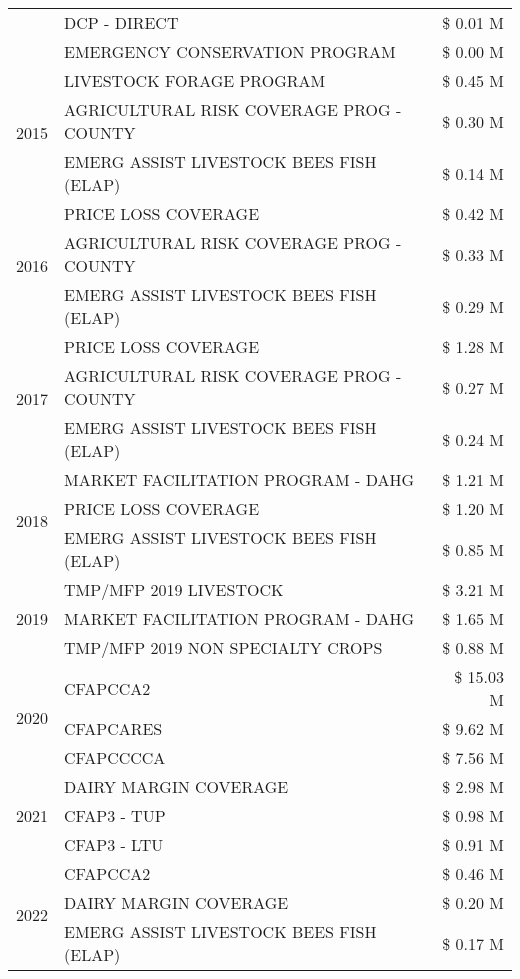 \begin{tabular}{llr}
 & DCP - DIRECT & \$ 0.01 M \\
 & EMERGENCY CONSERVATION PROGRAM & \$ 0.00 M \\
\cline{1-3}
\multirow[t]{3}{*}{2015} & LIVESTOCK FORAGE PROGRAM & \$ 0.45 M \\
 & AGRICULTURAL RISK COVERAGE PROG - COUNTY & \$ 0.30 M \\
 & EMERG ASSIST LIVESTOCK BEES FISH (ELAP) & \$ 0.14 M \\
\cline{1-3}
\multirow[t]{3}{*}{2016} & PRICE LOSS COVERAGE & \$ 0.42 M \\
 & AGRICULTURAL RISK COVERAGE PROG - COUNTY & \$ 0.33 M \\
 & EMERG ASSIST LIVESTOCK BEES FISH (ELAP) & \$ 0.29 M \\
\cline{1-3}
\multirow[t]{3}{*}{2017} & PRICE LOSS COVERAGE & \$ 1.28 M \\
 & AGRICULTURAL RISK COVERAGE PROG - COUNTY & \$ 0.27 M \\
 & EMERG ASSIST LIVESTOCK BEES FISH (ELAP) & \$ 0.24 M \\
\cline{1-3}
\multirow[t]{3}{*}{2018} & MARKET FACILITATION PROGRAM - DAHG & \$ 1.21 M \\
 & PRICE LOSS COVERAGE & \$ 1.20 M \\
 & EMERG ASSIST LIVESTOCK BEES FISH (ELAP) & \$ 0.85 M \\
\cline{1-3}
\multirow[t]{3}{*}{2019} & TMP/MFP 2019 LIVESTOCK & \$ 3.21 M \\
 & MARKET FACILITATION PROGRAM - DAHG & \$ 1.65 M \\
 & TMP/MFP 2019 NON SPECIALTY CROPS & \$ 0.88 M \\
\cline{1-3}
\multirow[t]{3}{*}{2020} & CFAPCCA2 & \$ 15.03 M \\
 & CFAPCARES & \$ 9.62 M \\
 & CFAPCCCCA & \$ 7.56 M \\
\cline{1-3}
\multirow[t]{3}{*}{2021} & DAIRY MARGIN COVERAGE & \$ 2.98 M \\
 & CFAP3 - TUP & \$ 0.98 M \\
 & CFAP3 - LTU & \$ 0.91 M \\
\cline{1-3}
\multirow[t]{3}{*}{2022} & CFAPCCA2 & \$ 0.46 M \\
 & DAIRY MARGIN COVERAGE & \$ 0.20 M \\
 & EMERG ASSIST LIVESTOCK BEES FISH (ELAP) & \$ 0.17 M \\
\cline{1-3}
\bottomrule
\end{tabular}
